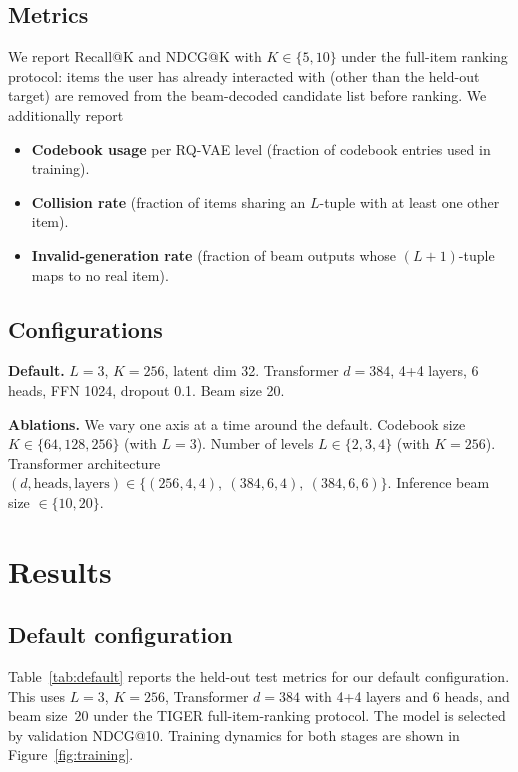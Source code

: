 \documentclass[sigconf]{acmart}
\begin{document}
\subsection{Metrics}
\begin{sloppypar}
We report Recall@K and NDCG@K with $K{\in}\{5,10\}$ under the full-item
ranking protocol: items the user has already interacted with (other than
the held-out target) are removed from the beam-decoded candidate list
before ranking.  We additionally report
\begin{itemize}
\item \textbf{Codebook usage} per RQ-VAE level (fraction of codebook
  entries used in training).
\item \textbf{Collision rate} (fraction of items sharing an $L$-tuple
  with at least one other item).
\item \textbf{Invalid-generation rate} (fraction of beam outputs whose
  $(L{+}1)$-tuple maps to no real item).
\end{itemize}
\end{sloppypar}

\subsection{Configurations}
\begin{sloppypar}
\textbf{Default.}  $L{=}3$, $K{=}256$, latent dim 32.  Transformer
$d{=}384$, 4+4 layers, 6 heads, FFN 1024, dropout 0.1.  Beam size 20.

\textbf{Ablations.}  We vary one axis at a time around the default.
Codebook size $K \in \{64, 128, 256\}$ (with $L{=}3$).  Number of
levels $L \in \{2, 3, 4\}$ (with $K{=}256$).  Transformer
architecture $(d, \text{heads}, \text{layers}) \in
\{(256{,}4{,}4),\allowbreak\ (384{,}6{,}4),\allowbreak\ (384{,}6{,}6)\}$.  Inference beam size $\in \{10, 20\}$.
\end{sloppypar}

\section{Results}
\subsection{Default configuration}
Table~\ref{tab:default} reports the held-out test metrics for our
default configuration.  This uses $L{=}3$, $K{=}256$, Transformer
$d{=}384$ with 4+4 layers and 6 heads, and beam size~$20$ under the
TIGER full-item-ranking protocol.  The model is selected by validation
NDCG@10.  Training dynamics for both stages are shown in
Figure~\ref{fig:training}.
\end{document}
